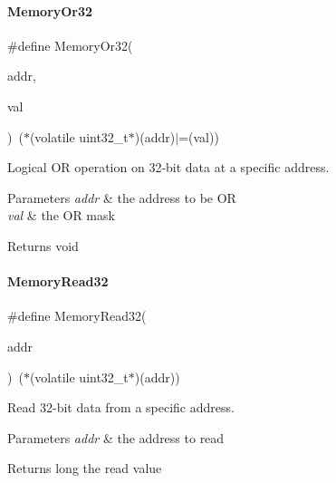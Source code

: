 \paragraph{\texorpdfstring{Memory\+Or32}{MemoryOr32}}
{\footnotesize\ttfamily \#define Memory\+Or32(\begin{DoxyParamCaption}\item[{}]{addr,  }\item[{}]{val }\end{DoxyParamCaption})~($\ast$(volatile uint32\+\_\+t$\ast$)(addr)$\vert$=(val))}



Logical OR operation on 32-\/bit data at a specific address. 


\begin{DoxyParams}{Parameters}
{\em addr} & the address to be OR \\
\hline
{\em val} & the OR mask \\
\hline
\end{DoxyParams}
\begin{DoxyReturn}{Returns}
void 
\end{DoxyReturn}
\mbox{\label{a00020_a2d484dc15bdf30ee11ab3b05f31f0e16}} 
\paragraph{\texorpdfstring{Memory\+Read32}{MemoryRead32}}
{\footnotesize\ttfamily \#define Memory\+Read32(\begin{DoxyParamCaption}\item[{}]{addr }\end{DoxyParamCaption})~($\ast$(volatile uint32\+\_\+t$\ast$)(addr))}



Read 32-\/bit data from a specific address. 


\begin{DoxyParams}{Parameters}
{\em addr} & the address to read \\
\hline
\end{DoxyParams}
\begin{DoxyReturn}{Returns}
long the read value 
\end{DoxyReturn}
\mbox{\label{a00020_a6b9732365b12e48ddb89fe1028b975b0}} 
